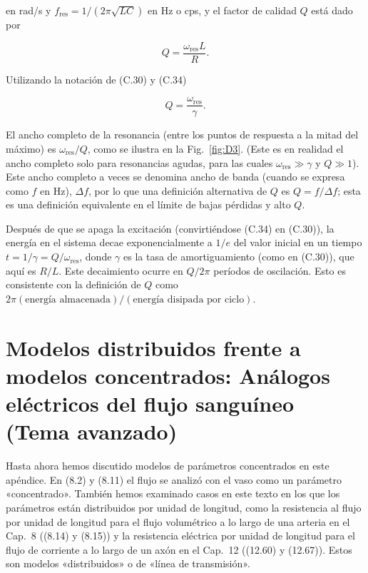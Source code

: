 \documentclass[12pt,a4paper]{book}
\begin{document}
en rad/s y $f_{\text{res}} = 1/(2\pi \sqrt{LC})$ en Hz o cps, y el factor de calidad $Q$ está dado por

\begin{equation}
Q = \frac{\omega_{\text{res}} L}{R}. \label{eq:D.6}
\end{equation}

Utilizando la notación de (C.30) y (C.34)

\begin{equation}
Q = \frac{\omega_{\text{res}}}{\gamma}. \label{eq:D.7}
\end{equation}

El ancho completo de la resonancia (entre los puntos de respuesta a la mitad del máximo) es $\omega_{\text{res}}/Q$, como se ilustra en la Fig.~\ref{fig:D3}. (Este es en realidad el ancho completo solo para resonancias agudas, para las cuales $\omega_{\text{res}} \gg \gamma$ y $Q \gg 1$). Este ancho completo a veces se denomina ancho de banda (cuando se expresa como $f$ en Hz), $\Delta f$, por lo que una definición alternativa de $Q$ es $Q = f/\Delta f$; esta es una definición equivalente en el límite de bajas pérdidas y alto $Q$.

Después de que se apaga la excitación (convirtiéndose (C.34) en (C.30)), la energía en el sistema decae exponencialmente a $1/e$ del valor inicial en un tiempo $t = 1/\gamma = Q/\omega_{\text{res}}$, donde $\gamma$ es la tasa de amortiguamiento (como en (C.30)), que aquí es $R/L$. Este decaimiento ocurre en $Q/2\pi$ períodos de oscilación. Esto es consistente con la definición de $Q$ como $2\pi(\text{energía almacenada})/(\text{energía disipada por ciclo})$.

\section[Análogos Eléctricos del Flujo Sanguíneo]{Modelos distribuidos frente a modelos concentrados: Análogos eléctricos del flujo sanguíneo (Tema avanzado)}
\label{sec:D.1}

Hasta ahora hemos discutido modelos de parámetros concentrados en este apéndice. En (8.2) y (8.11) el flujo se analizó con el vaso como un parámetro «concentrado». También hemos examinado casos en este texto en los que los parámetros están distribuidos por unidad de longitud, como la resistencia al flujo por unidad de longitud para el flujo volumétrico a lo largo de una arteria en el Cap.~8 ((8.14) y (8.15)) y la resistencia eléctrica por unidad de longitud para el flujo de corriente a lo largo de un axón en el Cap.~12 ((12.60) y (12.67)). Estos son modelos «distribuidos» o de «línea de transmisión».
\end{document}

